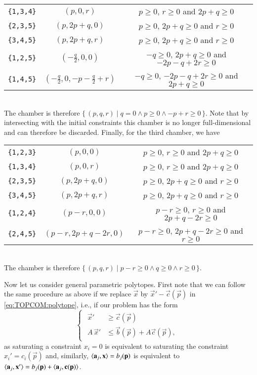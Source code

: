 \begin{example}
\begin{tabular}{ccc}
\\
\verb+{1,3,4}+ & $(p,0,r)$ & $p \ge 0$, $r \ge 0$ and $2p + q \ge 0$
\\
\verb+{2,3,5}+ & $(p, 2p+q, 0)$ & $p \ge 0$, $2p + q \ge 0$ and $r \ge 0$
\\
\verb+{3,4,5}+ & $(p, 2p+q, r)$ & $p \ge 0$, $2p + q \ge 0$ and $r \ge 0$
\\
\verb+{1,2,5}+ & $(-\frac q 2,0,0)$ &
	$-q \ge 0$, $2p + q \ge 0$ and $-2p -q+2r \ge 0$
\\
\verb+{1,4,5}+ & $(-\frac q 2,0,-p-\frac q 2+r)$ &
	$-q \ge 0$, $-2p -q+2r \ge 0$ and $2p + q \ge 0$
\end{tabular}
\\
The chamber is therefore
$
\{\,
(p,q,r) \mid q = 0 \wedge p \ge 0 \wedge -p +r \ge 0
\,\}
$.
Note that by intersecting with the initial constraints this chamber
is no longer full-dimensional and can therefore be discarded.
Finally, for the third chamber, we have
\\
\begin{tabular}{ccc}
\verb+{1,2,3}+ & $(p,0,0)$ & $p \ge 0$, $r \ge 0$ and $2p + q \ge 0$
\\
\verb+{1,3,4}+ & $(p,0,r)$ & $p \ge 0$, $r \ge 0$ and $2p + q \ge 0$
\\
\verb+{2,3,5}+ & $(p, 2p+q, 0)$ & $p \ge 0$, $2p + q \ge 0$ and $r \ge 0$
\\
\verb+{3,4,5}+ & $(p, 2p+q, r)$ & $p \ge 0$, $2p + q \ge 0$ and $r \ge 0$
\\
\verb+{1,2,4}+ & $(p-r,0,0)$ &
	$p -r \ge 0$, $r \ge 0$ and $2p +q -2r \ge 0$
\\
\verb+{2,4,5}+ & $(p-r,2p+q-2r, 0)$ &
	$p -r \ge 0$, $2p +q -2r \ge 0$ and $r \ge 0$
\end{tabular}
\\
The chamber is therefore
$
\{\,
(p,q,r) \mid p - r \ge 0 \wedge q \ge 0 \wedge r \ge 0
\,\}
$.
\end{example}

Now let us consider general parametric polytopes.
First note that we can follow the same procedure as above
if we replace $\vec x$ by $\vec x' - \vec c(\vec p)$
in \eqref{eq:TOPCOM:polytope}, i.e.,
if our problem has the form
\begin{equation}
\label{eq:TOPCOM:polytope:2}
\begin{cases}
    \begin{aligned}
\vec x' &\ge \vec c(\vec p)
\\
A \, \vec x' &\le \vec b(\vec p) + A \vec c(\vec p)
,
    \end{aligned}
\end{cases}
\end{equation}
as saturating a constraint $x_i = 0$ is equivalent
to saturating the constraint $x_i' = c_i(\vec p)$
and, similarly, $\sps {\vec a_j}{\vec x} = b_j(\vec p)$
is equivalent to
$\sps {\vec a_j}{\vec x'} = b_j(\vec p) + \sps {\vec a_j}{\vec c(\vec p)}$.

